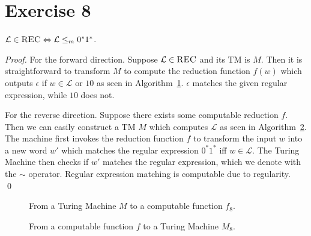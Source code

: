 \documentclass[11pt]{llncs}
\begin{document}
\section*{Exercise 8}
\begin{lemma}
$\mathcal{L} \in \textsc{REC} \Leftrightarrow \mathcal{L} \leq_m 0^*1^*$.
\end{lemma}
\begin{proof}
For the forward direction. Suppose $\mathcal{L} \in \textsc{REC}$ and its TM is
$M$. Then it is straightforward to transform $M$ to compute the reduction
function $f(w)$ which outputs $\epsilon$ if $w \in \mathcal{L}$ or $10$
as seen in Algorithm~\ref{alg.ex8a}. $\epsilon$ matches the given regular
expression, while $10$ does not.

For the reverse direction. Suppose there exists some computable reduction $f$.
Then we can easily construct a TM $M$ which computes $\mathcal{L}$ as seen in
Algorithm~\ref{alg.ex8b}. The machine first invokes the reduction function $f$
to transform the input $w$ into a new word $w'$ which matches the regular
expression $0^*1^*$ iff $w \in \mathcal{L}$. The Turing Machine then checks if
$w'$ matches the regular expression, which we denote with the $\sim$ operator.
Regular expression matching is computable due to regularity.
\qed
\end{proof}

\begin{figure}[t]
\begin{algorithm}[H]
  \caption{\label{alg.ex8a}
      From a Turing Machine $M$ to a computable function $f_8$.
  }
  \begin{algorithmic}[1]
            \State\Return{$\epsilon$}
        \Else
            \State{}
        \EndIf
      \EndFunction
  \end{algorithmic}
\end{algorithm}
\end{figure}

\begin{figure}[t]
\begin{algorithm}[H]
  \caption{\label{alg.ex8b}
      From a computable function $f$ to a Turing Machine $M_8$.
  }
  \begin{algorithmic}[1]
            \State{}
        \Else
            \State{}
        \EndIf
      \EndFunction
  \end{algorithmic}
\end{algorithm}
\end{figure}
\end{document}
